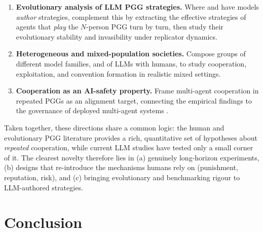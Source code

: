 \documentclass[11pt,a4paper]{article}
\begin{document}
\begin{enumerate}
  high-impact niche.
  \item \textbf{Evolutionary analysis of LLM PGG strategies.} Where
  \citet{willis2025cooperate} and \citet{willis2026hundreds} have models
  \emph{author} strategies, complement this by extracting the effective strategies
  of agents that \emph{play} the $N$-person PGG turn by turn, then study their
  evolutionary stability and invasibility under replicator dynamics.
  \item \textbf{Heterogeneous and mixed-population societies.} Compose groups of
  different model families, and of LLMs with humans, to study cooperation,
  exploitation, and convention formation \citep{ashery2025emergent} in realistic
  mixed settings.
  \item \textbf{Cooperation as an AI-safety property.} Frame multi-agent
  cooperation in repeated PGGs as an alignment target, connecting the empirical
  findings to the governance of deployed multi-agent systems
  \citep{guo2024multiagent,sun2025gametheory}.
\end{enumerate}

\noindent
Taken together, these directions share a common logic: the human and evolutionary
PGG literature provides a rich, quantitative set of hypotheses about \emph{repeated}
cooperation, while current LLM studies have tested only a small corner of it. The
clearest novelty therefore lies in (a) genuinely long-horizon experiments, (b)
designs that re-introduce the mechanisms humans rely on (punishment, reputation,
risk), and (c) bringing evolutionary and benchmarking rigour to LLM-authored
strategies.

\section{Conclusion}
\label{sec:conclusion}
\end{document}

